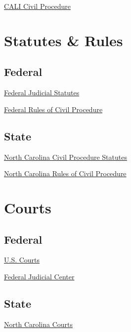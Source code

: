 \documentclass[11pt,letterpaper,twoside]{article}
\begin{document}

\href{https://www.cali.org/category/1l-first-year-lesson-topics/civil-procedure}{CALI
Civil Procedure}

\section*{Statutes \& Rules}\label{statutes-rules}


\subsection*{Federal}\label{federal}

\href{https://www.law.cornell.edu/uscode/text/28}{Federal Judicial
Statutes}

\href{https://www.law.cornell.edu/rules/frcp}{Federal Rules of Civil
Procedure}

\subsection*{State}\label{state}

\href{https://www.ncleg.gov/Laws/GeneralStatuteSections/Chapter1}{North
Carolina Civil Procedure Statutes}

\href{https://www.ncleg.gov/Laws/GeneralStatuteSections/Chapter1A}{North
Carolina Rules of Civil Procedure}

\section*{Courts}\label{courts}


\subsection*{Federal}\label{federal-1}

\href{https://www.uscourts.gov/}{U.S. Courts}

\href{https://www.fjc.gov/}{Federal Judicial Center}

\subsection*{State}\label{state-1}

\href{https://www.nccourts.gov/}{North Carolina Courts}
\end{document}
